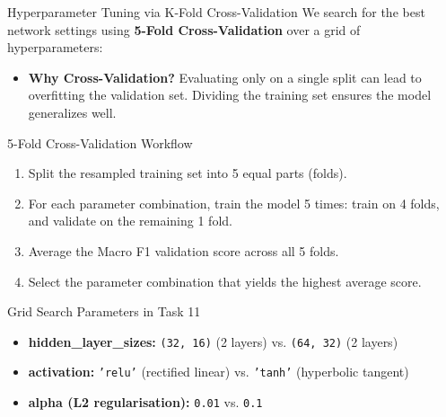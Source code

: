 \documentclass[9pt]{beamer}
\begin{document}
\begin{frame}{Hyperparameter Tuning via K-Fold Cross-Validation}
  We search for the best network settings using \textbf{5-Fold Cross-Validation} over a grid of hyperparameters:
  \begin{itemize}
    \item \textbf{Why Cross-Validation?} Evaluating only on a single split can lead to overfitting the validation set. Dividing the training set ensures the model generalizes well.
  \end{itemize}
  \begin{block}{5-Fold Cross-Validation Workflow}
    \begin{enumerate}
      \item Split the resampled training set into 5 equal parts (folds).
      \item For each parameter combination, train the model 5 times: train on 4 folds, and validate on the remaining 1 fold.
      \item Average the Macro F1 validation score across all 5 folds.
      \item Select the parameter combination that yields the highest average score.
    \end{enumerate}
  \end{block}
  \begin{block}{Grid Search Parameters in Task 11}
    \begin{itemize}
      \item \textbf{hidden\_layer\_sizes:} \texttt{(32, 16)} (2 layers) vs. \texttt{(64, 32)} (2 layers)
      \item \textbf{activation:} \texttt{'relu'} (rectified linear) vs. \texttt{'tanh'} (hyperbolic tangent)
      \item \textbf{alpha (L2 regularisation):} \texttt{0.01} vs. \texttt{0.1}
    \end{itemize}
  \end{block}
\end{frame}
\end{document}
